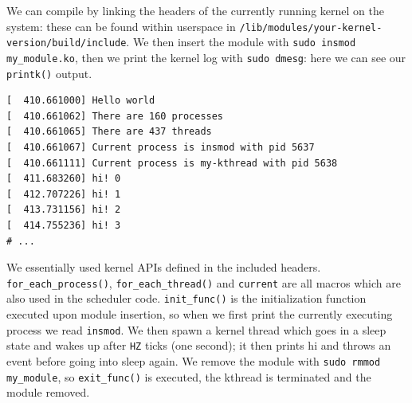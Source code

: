 \documentclass[10pt]{book}
\begin{document}
We can compile by linking the headers of the currently running kernel on the system: these can be found within userspace in \verb|/lib/modules/your-kernel-version/build/include|. We then insert the module with \verb|sudo insmod my_module.ko|, then we print the kernel log with \verb|sudo dmesg|: here we can see our \verb|printk()| output.
\begin{Verbatim}
[  410.661000] Hello world
[  410.661062] There are 160 processes
[  410.661065] There are 437 threads
[  410.661067] Current process is insmod with pid 5637
[  410.661111] Current process is my-kthread with pid 5638
[  411.683260] hi! 0
[  412.707226] hi! 1
[  413.731156] hi! 2
[  414.755236] hi! 3
# ...
\end{Verbatim}
We essentially used kernel APIs defined in the included headers. \verb|for_each_process()|, \verb|for_each_thread()| and \verb|current| are all macros which are also used in the scheduler code. \verb|init_func()| is the initialization function executed upon module insertion, so when we first print the currently executing process we read \verb|insmod|. We then spawn a kernel thread which goes in a sleep state and wakes up after \verb|HZ| ticks (one second); it then prints hi and throws an event before going into sleep again. We remove the module with \verb|sudo rmmod my_module|, so \verb|exit_func()| is executed, the kthread is terminated and the module removed.
\end{document}
